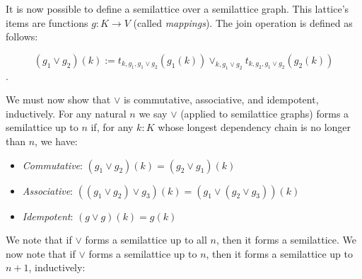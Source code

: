\documentclass{article}
\begin{document}
        It is now possible to define a semilattice over a semilattice graph. This lattice's items are functions $g : K \rightarrow V$ (called \emph{mappings}). The join operation is defined as follows:

        $$ (g_1 \vee g_2)(k) := t_{k, g_1, g_1 \vee g_2}(g_1(k)) \vee_{k, g_1 \vee g_2} t_{k, g_2, g_1 \vee g_2}(g_2(k))$$.

        We must now show that $\vee$ is commutative, associative, and idempotent, inductively. For any natural $n$ we say $\vee$ (applied to semilattice graphs) forms a semilattice up to $n$ if, for any $k : K$ whose longest dependency chain is no longer than $n$, we have:

        \begin{itemize}
          \item \emph{Commutative}: $(g_1 \vee g_2)(k) = (g_2 \vee g_1)(k)$
          \item \emph{Associative}: $((g_1 \vee g_2) \vee g_3)(k) = (g_1 \vee (g_2 \vee g_3))(k)$
          \item \emph{Idempotent}: $(g \vee g)(k) = g(k)$
        \end{itemize}

        We note that if $\vee$ forms a semilattice up to all $n$, then it forms a semilattice. We now note that if $\vee$ forms a semilattice up to $n$, then it forms a semilattice up to $n+1$, inductively:
\end{document}
